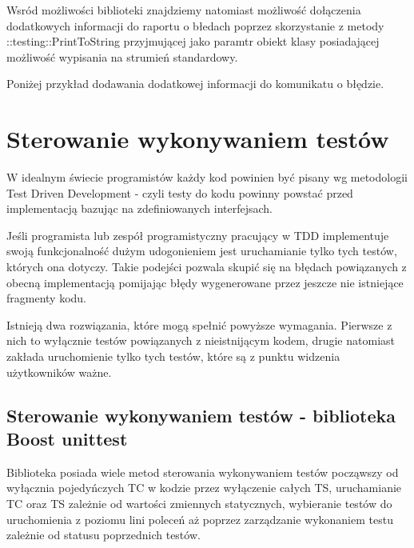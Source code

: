 \documentclass[12pt,a4paper,notitlepage]{report}
\begin{document}
Wsród możliwości biblioteki znajdziemy natomiast możliwość dołączenia dodatkowych informacji do raportu o błedach poprzez skorzystanie z metody ::testing::PrintToString przyjmującej jako paramtr obiekt klasy posiadającej możliwość wypisania na strumień standardowy.

Poniżej przykład dodawania dodatkowej informacji do komunikatu o błędzie.

			

\chapter{Sterowanie wykonywaniem testów}

W idealnym świecie programistów każdy kod powinien być pisany wg metodologii Test Driven Development - czyli testy do kodu powinny powstać przed implementacją bazując na zdefiniowanych interfejsach.

Jeśli programista lub zespół programistyczny pracujący w TDD implementuje swoją funkcjonalność dużym udogonieniem jest uruchamianie tylko tych testów, których ona dotyczy. Takie podejści pozwala skupić się na błędach powiązanych z obecną implementacją pomijając błędy wygenerowane przez jeszcze nie istniejące fragmenty kodu.

Istnieją dwa rozwiązania, które mogą spełnić powyższe wymagania. Pierwsze z nich to wyłącznie testów powiązanych z nieistnijącym kodem, drugie natomiast zakłada uruchomienie tylko tych testów, które są z punktu widzenia użytkowników ważne.

\section{Sterowanie wykonywaniem testów - biblioteka Boost unittest}

Biblioteka posiada wiele metod sterowania wykonywaniem testów począwszy od wyłącznia pojedyńczych TC w kodzie przez wyłączenie całych TS, uruchamianie TC oraz TS zależnie od wartości zmiennych statycznych, wybieranie testów do uruchomienia z poziomu lini poleceń aż poprzez zarządzanie wykonaniem testu zależnie od statusu poprzednich testów.
\end{document}
